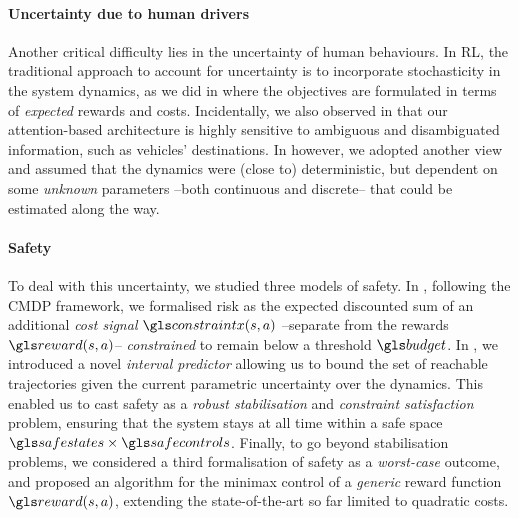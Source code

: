 \paragraph{Uncertainty due to human drivers}
Another critical difficulty lies in the uncertainty of human behaviours. In \gls{RL}, the traditional approach to account for uncertainty is to incorporate stochasticity in the system dynamics, as we did in  where the objectives are formulated in terms of \emph{expected} rewards and costs. Incidentally, we also observed in  that our attention-based architecture is highly sensitive to ambiguous and disambiguated information, such as vehicles' destinations. In  however, we adopted another view and assumed that the dynamics were (close to) deterministic, but dependent on some \emph{unknown} parameters --both continuous and discrete-- that could be estimated along the way.

\paragraph{Safety}
To deal with this uncertainty, we studied three models of safety. In , following the \gls{CMDP} framework, we formalised risk as the expected discounted sum of an additional \emph{cost signal} $\constraint(s,a)$ --separate from the rewards $\reward(s,a)$-- \emph{constrained} to remain below a threshold $\budget$. In , we introduced a novel \emph{interval predictor} allowing us to bound the set of reachable trajectories given the current parametric uncertainty over the dynamics. This enabled us to cast safety as a \emph{robust stabilisation} and \emph{constraint satisfaction} problem, ensuring that the system stays at all time within a safe space $\safestates\times\safecontrols$. Finally, to go beyond stabilisation problems, we considered a third formalisation of safety as a \emph{worst-case} outcome, and proposed an algorithm for the minimax control of a \emph{generic} reward function $\R(s,a)$, extending the state-of-the-art so far limited to quadratic costs.

